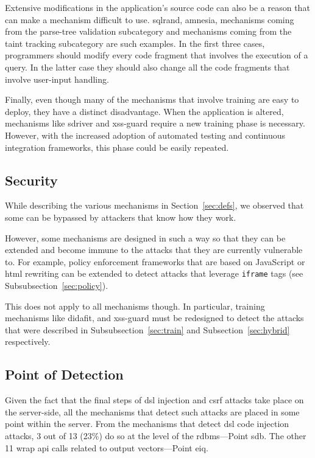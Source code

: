 \documentclass[conference]{IEEEtran}
\begin{document}
Extensive modifications in the application's source
code can also be a reason that can make a mechanism
difficult to use. {\sc sql}rand, {\sc amnesia},
mechanisms coming from the parse-tree validation
subcategory and mechanisms coming from the taint
tracking subcategory are such examples.
In the first three cases, programmers should modify every
code fragment that involves the execution of a query.
In the latter case they should also change
all the code fragments that involve user-input handling. 

Finally, even though many of the mechanisms that involve
training are easy to deploy, they have a distinct disadvantage.
When the application is altered, mechanisms like {\sc sd}river
and {\sc xss-guard} require a new training phase is necessary.
However, with the increased adoption of automated testing
and continuous integration frameworks, this phase could be
easily repeated.

\subsection{Security}

While describing the various mechanisms in
Section~\ref{sec:defs}, we observed that some
can be bypassed by attackers that know how they
work.

However, some mechanisms are designed in such a way
so that they can be extended and become immune to
the attacks that they are currently vulnerable to. For
example, policy enforcement frameworks that are
based on JavaScript or {\sc html} rewriting
can be extended to detect attacks that leverage
{\tt iframe} tags (see Subsubsection~\ref{sec:policy}).

This does not apply to all mechanisms though.
In particular, training mechanisms like {\sc didafit},
and {\sc xss-guard} must be redesigned
to detect the attacks that were described in
Subsubsection~\ref{sec:train} and
Subsection~\ref{sec:hybrid} respectively.

\subsection{Point of Detection}

Given the fact that the final steps of
{\sc dsl} injection and {\sc csrf} attacks take place
on the server-side, all the mechanisms that detect
such attacks are placed in some point within the server.
From the mechanisms that detect {\sc dsl} code injection
attacks, 3 out of 13 (23\%) do so at the level
of the {\sc rdbms}---Point {\sc sdb}.
The other 11 wrap {\sc api} calls related to output
vectors---Point {\sc e}i{\sc q}.
\end{document}
